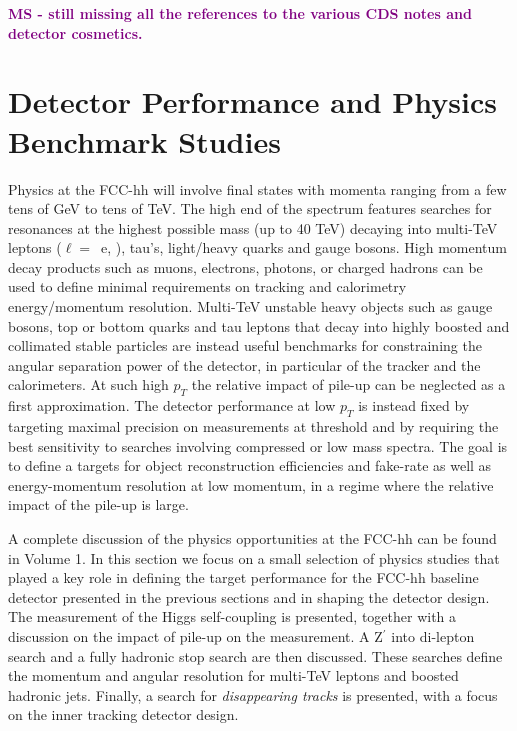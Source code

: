 \documentclass[11pt,twoside,a4paper]{cernrep}
\newcommand{\MS}[1]{\textbf{\textcolor{purple}{MS - #1}}}
\begin{document}

\MS{still missing all the references to the various CDS notes and detector cosmetics.}

\section{Detector Performance and Physics Benchmark Studies}

Physics at the FCC-hh will involve final states with momenta ranging from a few tens of GeV to tens of TeV. The high end of the spectrum features searches for resonances at the highest possible mass (up to 40 TeV) decaying into multi-TeV leptons ($\ell=$~e, \textmu), tau's, light/heavy quarks and gauge bosons. High momentum decay products such as muons, electrons, photons, or charged hadrons can be used to define minimal requirements on tracking and calorimetry energy/momentum resolution. Multi-TeV unstable heavy objects such as gauge bosons, top or bottom quarks and tau leptons that decay into highly boosted and collimated stable particles are instead useful benchmarks for constraining the angular separation power of the detector, in particular of the tracker and the calorimeters. At such high $p_{T}$ the relative impact of pile-up can be neglected as a first approximation.
The detector performance at low $p_{T}$ is instead fixed by targeting maximal precision on measurements at threshold and by requiring the best sensitivity to searches involving compressed or low mass spectra. The goal is to define a targets for object reconstruction efficiencies and fake-rate as well as energy-momentum resolution at low momentum, in a regime where the relative impact of the pile-up is large.

A complete discussion of the physics opportunities at the FCC-hh can be found in Volume 1. In this section we focus on a small selection of physics studies that played a key role in defining the target performance for the FCC-hh baseline detector presented in the previous sections and in shaping the detector design. The measurement of the Higgs self-coupling is presented, together with a discussion on the impact of pile-up on the measurement. A Z$^{\prime}$ into di-lepton search and a fully hadronic stop search are then discussed. These searches define the momentum and angular resolution for multi-TeV leptons and boosted hadronic jets. Finally, a search for \emph{disappearing tracks} is presented, with a focus on the inner tracking detector design.
\end{document}
